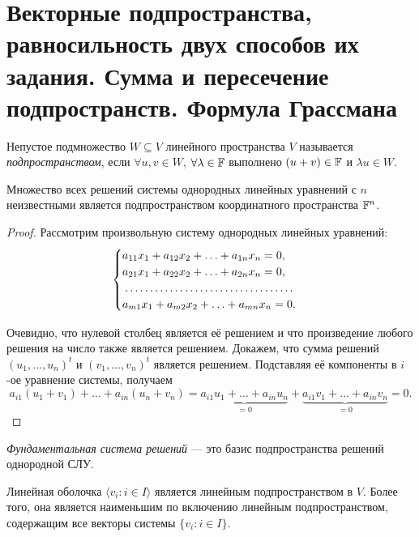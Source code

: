 \section{Векторные подпространства, равносильность двух способов их задания. Сумма и пересечение подпространств. Формула Грассмана}

\begin{definition}
    Непустое подмножество $W \subseteq V$ линейного пространства $V$ называется \textit{подпространством}, если $\forall u, v \in W$, $\forall \lambda \in \mathbb{F}$ выполнено $(u + v) \in \mathbb{F}$ и $\lambda u \in W$.
\end{definition}

\begin{proposal}
    Множество всех решений системы однородных линейных уравнений с $n$ неизвестными является подпространством координатного пространства $\mathbb{F}^n$.
\end{proposal}

\begin{proof}
    Рассмотрим произвольную систему однородных линейных уравнений:
    \[
        \begin{cases}
            a_{11}x_1 + a_{12}x_2 + \ldots + a_{1n}x_n = 0,\\
            a_{21}x_1 + a_{22}x_2 + \ldots + a_{2n}x_n = 0,\\
            \dotfill\\
            a_{m1}x_1 + a_{m2}x_2 + \ldots + a_{mn}x_n = 0.\\
        \end{cases}
    \]

    Очевидно, что нулевой столбец является её решением и что произведение любого решения на число также является решением. Докажем, что сумма решений $(u_1, \ldots, u_n)^t$ и $(v_1, \ldots, v_n)^t$ является решением. Подставляя её компоненты в $i$-ое уравнение системы, получаем
    \[
        a_{i1}(u_1 + v_1) + \ldots + a_{in}(u_n + v_n) = \underbrace{a_{i1}u_1 + \ldots + a_{in}u_n}_{= 0} + \underbrace{a_{i1}v_1 + \ldots + a_{in}v_n}_{= 0} = 0.
    \]
\end{proof}

\begin{definition}
    \textit{Фундаментальная система решений} --- это базис подпространства решений однородной СЛУ.
\end{definition}

\begin{proposal}
    Линейная оболочка $\langle v_i : i \in I \rangle$ является линейным подпространством в $V$. Более того, она является наименьшим по включению линейным подпространством, содержащим все векторы системы $\{v_i : i \in I\}$.
\end{proposal}

